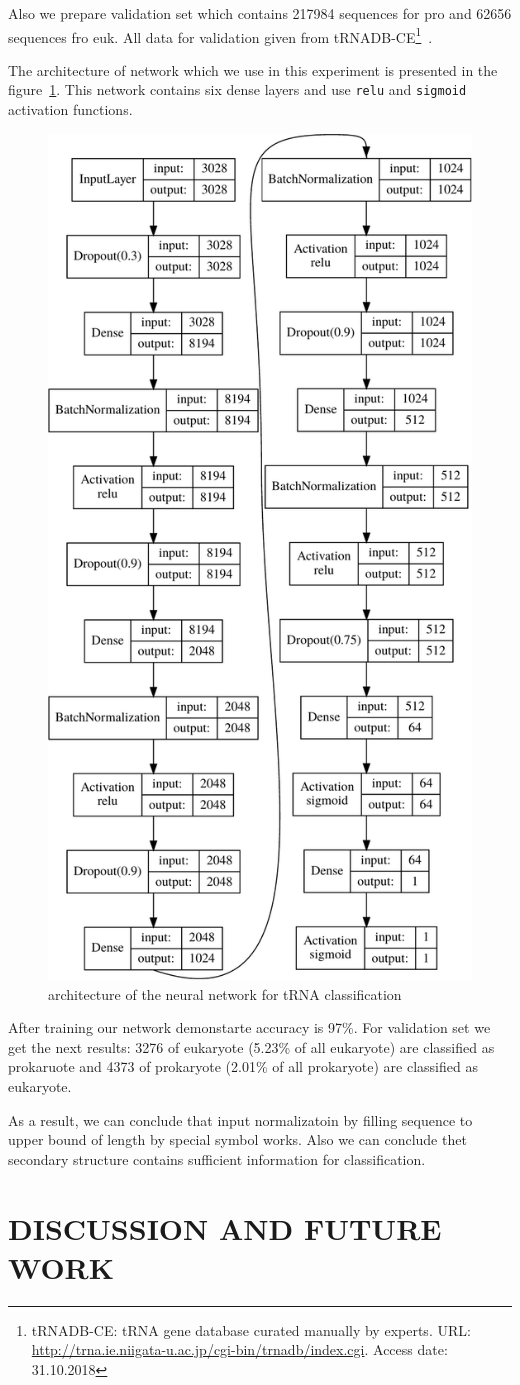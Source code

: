 \documentclass[a4paper,twoside]{article}
\begin{document}
Also we prepare validation set which contains 217984 sequences for pro and 62656 sequences fro euk.
All data for validation given from tRNADB-CE\footnote{tRNADB-CE: tRNA gene database curated manually by experts. URL: \url{http://trna.ie.niigata-u.ac.jp/cgi-bin/trnadb/index.cgi}. Access date: 31.10.2018}~\cite{Abe2010}.

The architecture of network which we use in this experiment is presented in the figure~\ref{fig:nn}.
This network contains six dense layers and use \verb|relu| and \verb|sigmoid| activation functions.

\begin{figure}
\centering
\includegraphics[width=.4\textwidth]{figures/model-crop.pdf}
\caption{architecture of the neural network for tRNA classification}
\label{fig:nn}
\end{figure}

After training our network demonstarte accuracy is 97\%. 
For validation set we get the next results: 3276 of eukaryote (5.23\% of all eukaryote) are classified as prokaruote and 4373 of prokaryote (2.01\% of all prokaryote) are classified as eukaryote. 

As a result, we can conclude that input normalizatoin by filling sequence to upper bound of length by special symbol works.
Also we can conclude thet secondary structure contains sufficient information for classification.


\section{\uppercase{Discussion and Future Work}}
\label{sec:Discussion}
\end{document}
